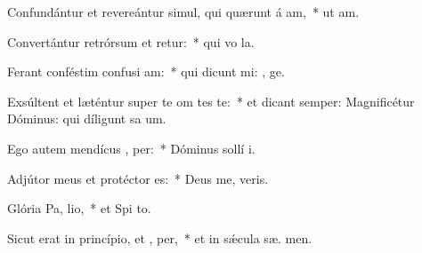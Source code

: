 \item Confundántur et revereántur simul, qui quærunt á am,~* ut  am.
\item Convertántur retrórsum et retur:~* qui vo  la.
\item Ferant conféstim confusi am:~* qui dicunt mi: , ge.
\item Exsúltent et læténtur super te om tes te:~* et dicant semper: Magnificétur Dóminus: qui díligunt sa um.
\item Ego autem mendícus ,  per:~* Dóminus sollí  i.
\item Adjútor meus et protéctor   es:~* Deus me,  veris.
\item Glória Pa,  lio,~* et Spi to.
\item Sicut erat in princípio, et ,  per,~* et in sǽcula sæ. men.
